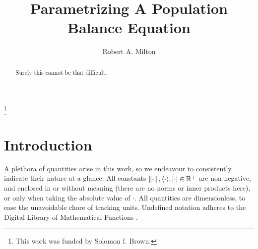 \documentclass[a4paper]{base}
\newcommand{\stoch}[1]{\M{\langle #1 \rangle}}
\begin{document}
    \title{Parametrizing A Population Balance Equation}
    \author[R.A. Milton]{Robert A. Milton}
    \address{Department of Chemical, Materials and Biological Engineering, The University of Sheffield, Sheffield~S1~3JD, United Kingdom}
    \thanks{This work was funded by Solomon f. Brown.}
    \subjclass[2010]{}
    \begin{abstract}
        Surely this cannot be that difficult.
    \end{abstract}
    \maketitle


\section{Introduction}\label{sec:intro}
    A plethora of quantities arise in this work, so we endeavour to consistently indicate their nature at a glance.
    All constants $\norm{\cdot},\stoch{\cdot},\mds{\cdot}\in\overline{\mathbb{R}^{+}}$ are non-negative, and enclosed in \norm{\cdot} or \stoch{\cdot} without meaning (there are no norms or inner products here), or \mds{\cdot} only when taking the absolute value of $\cdot$.
    All  quantities are dimensionless, to ease the unavoidable chore of tracking units.
    Undefined notation adheres to the Digital Library of Mathematical Functions \cite{NIST:DLMF}.
    
\end{document}

